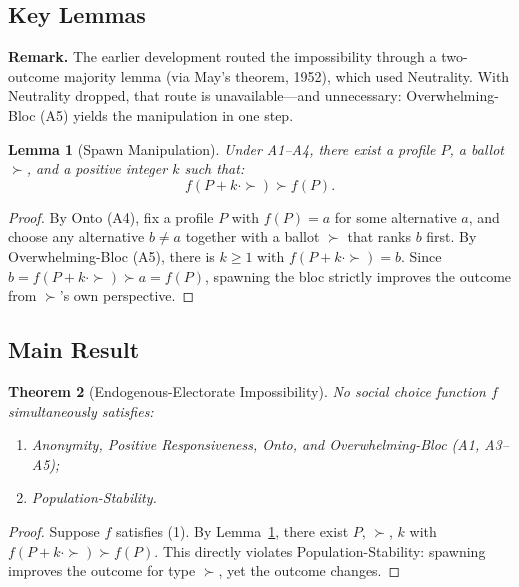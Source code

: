 \documentclass[12pt]{article}
\newtheorem{theorem}{Theorem}[section]
\newtheorem{lemma}[theorem]{Lemma}
\newcommand{\added}[1]{\textbf{#1}}
\begin{document}
\subsection{Key Lemmas}

\noindent\added{\textbf{Remark.}} The earlier development routed the impossibility through a two-outcome majority lemma (via May's theorem, 1952), which used Neutrality. With Neutrality dropped, that route is unavailable---and unnecessary: Overwhelming-Bloc (A5) yields the manipulation in one step.

\begin{lemma}[Spawn Manipulation]
\label{lem:spawn-manipulation}
Under A1--A4, there exist a profile $P$, a ballot $\succ$, and a positive integer $k$ such that:
\[
f(P + k \cdot \succ) \succ f(P).
\]
\end{lemma}

\begin{proof}
By Onto (A4), fix a profile $P$ with $f(P) = a$ for some alternative $a$, and choose any alternative $b \neq a$ together with a ballot $\succ$ that ranks $b$ first. By Overwhelming-Bloc (A5), there is $k \geq 1$ with $f(P + k \cdot \succ) = b$. Since $b = f(P + k \cdot \succ) \succ a = f(P)$, spawning the bloc strictly improves the outcome from $\succ$'s own perspective.
\end{proof}

\subsection{Main Result}

\begin{theorem}[Endogenous-Electorate Impossibility]
\label{thm:electorate-impossibility}
No social choice function $f$ simultaneously satisfies:
\begin{enumerate}
    \item Anonymity, Positive Responsiveness, Onto, and Overwhelming-Bloc (A1, A3--A5);
    \item Population-Stability.
\end{enumerate}
\end{theorem}

\begin{proof}
Suppose $f$ satisfies (1). By Lemma~\ref{lem:spawn-manipulation}, there exist $P$, $\succ$, $k$ with $f(P + k \cdot \succ) \succ f(P)$. This directly violates Population-Stability: spawning improves the outcome for type $\succ$, yet the outcome changes.
\end{proof}
\end{document}
